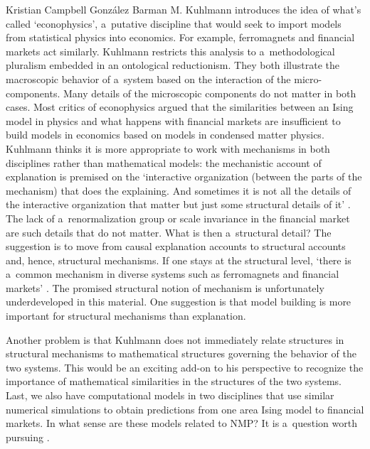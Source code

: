 \begin{recengenv}{Kristian Campbell González Barman}
\enlargethispage{1.5\baselineskip}
M. Kuhlmann introduces the idea of what's called ‘econophysics', a~putative discipline that would seek to import models from statistical physics into economics. For example, ferromagnets and financial markets act similarly. Kuhlmann restricts this analysis to a~methodological pluralism embedded in an ontological reductionism. They both illustrate the macroscopic behavior of a~system based on the interaction of the micro-components. Many details of the microscopic components do not matter in both cases. Most critics of econophysics argued that the similarities between an Ising model in physics and what happens with financial markets are insufficient to build models in economics based on models in condensed matter physics. Kuhlmann thinks it is more appropriate to work with mechanisms in both disciplines rather than mathematical models: the mechanistic account of explanation is premised on the ‘interactive organization (between the parts of the mechanism) that does the explaining. And sometimes it is not all the details of the interactive organization that matter but just some structural details of it'
\parencite*[][p.195]{falkenburg_mechanistic_2019}. %
 The lack of a~renormalization group or scale invariance in the financial market are such details that do not matter. What is then a~structural detail? The suggestion is to move from causal explanation accounts to structural accounts and, hence, structural mechanisms. If one stays at the structural level, ‘there is a~common mechanism in diverse systems such as ferromagnets and financial markets' 
\parencite*[][p.198]{falkenburg_mechanistic_2019}. %
 The promised structural notion of mechanism is unfortunately underdeveloped in this material. One suggestion is that model building is more important for structural mechanisms than explanation.

Another problem is that Kuhlmann does not immediately relate structures in structural mechanisms to mathematical structures governing the behavior of the two systems. This would be an exciting add-on to his perspective to recognize the importance of mathematical similarities in the structures of the two systems. Last, we also have computational models in two disciplines that use similar numerical simulations to obtain predictions from one area Ising model to financial markets. In what sense are these models related to NMP? It is a~question worth pursuing
\parencite[see a~possible connection in][]{humphreys_knowledge_2019}.%



\end{recengenv}

